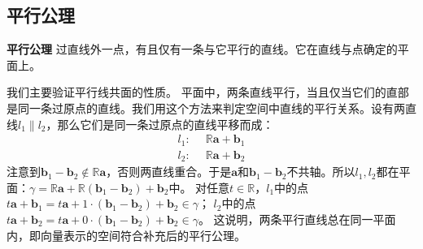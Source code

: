 \documentclass[12pt,UTF8]{ctexbook}
\begin{document}
\begin{appendix}
\section{平行公理}
\begin{po}{\textbf{平行公理}}
    过直线外一点，有且仅有一条与它平行的直线。它在直线与点确定的平面上。
\end{po}
我们主要验证平行线共面的性质。
平面中，两条直线平行，当且仅当它们的直部是同一条过原点的直线。我们用这个方法来判定空间中直线的平行关系。设有两直线$l_1\parallel l_2$，那么它们是同一条过原点的直线平移而成：
\begin{align*}
l_1: & \,\,\, \mathbb{R}\mathbf{a} + \mathbf{b}_1  \\
l_2: & \,\,\, \mathbb{R}\mathbf{a} + \mathbf{b}_2
\end{align*}
注意到$\mathbf{b}_1 - \mathbf{b}_2 \notin \mathbb{R}\mathbf{a}$，否则两直线重合。于是$\mathbf{a}$和$\mathbf{b}_1 - \mathbf{b}_2$不共轴。所以$l_1,l_2$都在平面：$\gamma = \mathbb{R}\mathbf{a} + \mathbb{R}(\mathbf{b}_1 - \mathbf{b}_2) + \mathbf{b}_2$中。
对任意$t\in\mathbb{R}$，$l_1$中的点$t\mathbf{a} + \mathbf{b}_1 = t\mathbf{a} + 1\cdot(\mathbf{b}_1 - \mathbf{b}_2) + \mathbf{b}_2 \in \gamma$；
$l_2$中的点$t\mathbf{a} + \mathbf{b}_2 = t\mathbf{a} + 0\cdot(\mathbf{b}_1 - \mathbf{b}_2) + \mathbf{b}_2 \in \gamma$。
这说明，两条平行直线总在同一平面内，即向量表示的空间符合补充后的平行公理。

\end{appendix}




\end{document}
